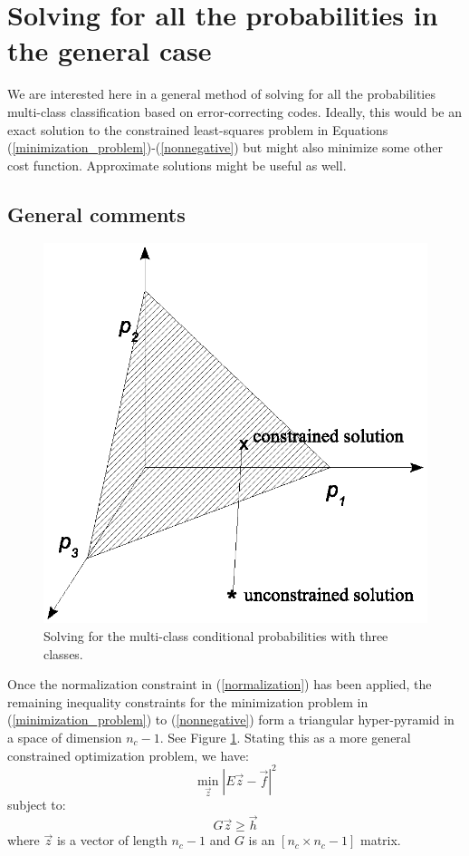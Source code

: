 \section{Solving for all the probabilities in the general case}

\label{general_case_solution}

We are interested here in a general method of solving for all the probabilities
multi-class classification based on error-correcting codes.
Ideally, this would be an exact solution to the constrained least-squares problem
in Equations (\ref{minimization_problem})-(\ref{nonnegative}) but might also
minimize some other cost function.
Approximate solutions might be useful as well.

\subsection{General comments}

\begin{figure}
	\includegraphics[width=1\textwidth]{../multi2/config1.eps}
	\caption{Solving for the multi-class conditional probabilities with three classes.}
	\label{config1}
\end{figure}

Once the normalization constraint in (\ref{normalization}) has been applied,
the remaining inequality constraints for the minimization problem in
(\ref{minimization_problem}) to (\ref{nonnegative}) form a triangular
hyper-pyramid in a space of dimension $n_c-1$.
See Figure \ref{config1}.
Stating this as a more general constrained optimization problem, we have:
\begin{equation}
	\min_{\vec z} | E \vec z - \vec f |^2
	\label{minimization2}
\end{equation}
subject to:
\begin{equation}
	G \vec z \ge \vec h
	\label{inequality2}
\end{equation}
where $\vec z$ is a vector of length $n_c-1$ 
and $G$ is an $[n_c \times n_c-1]$ matrix.

